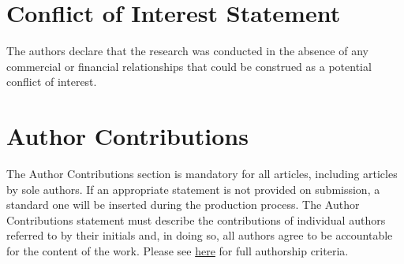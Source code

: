\documentclass[utf8]{frontiersSCNS} %
\begin{document}





\section*{Conflict of Interest Statement}

The authors declare that the research was conducted in the absence of any commercial or financial relationships that could be construed as a potential conflict of interest.

\section*{Author Contributions}

The Author Contributions section is mandatory for all articles, including articles by sole authors. If an appropriate statement is not provided on submission, a standard one will be inserted during the production process. The Author Contributions statement must describe the contributions of individual authors referred to by their initials and, in doing so, all authors agree to be accountable for the content of the work. Please see  \href{http://home.frontiersin.org/about/author-guidelines#AuthorandContributors}{here} for full authorship criteria.
\end{document}
